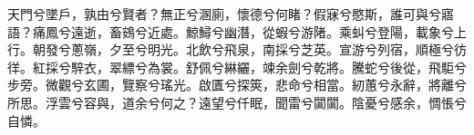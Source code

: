
\begin{pinyinscope}
天門兮墜戶，孰由兮賢者？無正兮溷廁，懷德兮何睹？假寐兮愍斯，誰可與兮寤語？痛鳳兮遠逝，畜鴳兮近處。鯨鱘兮幽潛，從蝦兮游陼。乘虯兮登陽，載象兮上行。朝發兮蔥嶺，夕至兮明光。北飲兮飛泉，南採兮芝英。宣游兮列宿，順極兮彷徉。紅採兮騂衣，翠縹兮為裳。舒佩兮綝纚，竦余劍兮乾將。騰蛇兮後從，飛駏兮步旁。微觀兮玄圃，覽察兮瑤光。啟匱兮探筴，悲命兮相當。紉蕙兮永辭，將離兮所思。浮雲兮容與，道余兮何之？遠望兮仟眠，聞雷兮闐闐。陰憂兮感余，惆悵兮自憐。


\end{pinyinscope}
